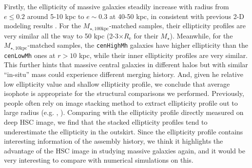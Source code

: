 \documentclass{emulateapj}
\def\rbcg{\texttt{cenHighMh}}
\def\nbcg{\texttt{cenLowMh}}
\def\mstar{{$M_{\star}$}}
\def\minn{{$M_{\star,10\mathrm{kpc}}$}}
\def\mtot{{$M_{\star,100\mathrm{kpc}}$}}
\begin{document}
\begin{CJK*}{UTF8}{gbsn}
    Firstly, the ellipticity of massive galaxies steadily increase with radius 
    from $e\le 0.2$ around 5-10 kpc to $e\sim 0.3$ at 40-50 kpc, in consistent with 
    previous 2-D modeling results \citep{Huang2013a}.  
    For the \mtot{}-matched samples, their ellipticity profiles are very similar 
    all the way to 50 kpc (2-3$\times R_{\mathrm{e}}$ for their \mstar{}). 
    Meanwhile, for the \minn{}-matched samples, the \rbcg{} galaxies have higher 
    ellipticity than the \nbcg{} ones at $r > 10$ kpc, while their inner ellipticity 
    profiles are very similar.  
    This further hints that massive central galaxies in different halos but with 
    similar ``in-situ'' mass could experience different merging history.
    And, given he relative low ellipticity value and shallow ellipticity profile, 
    we conclude that average isophote is appropriate for the structural comparisons 
    we performed.
    Previously, people often rely on image stacking method to extract ellipticity 
    profile out to large radius (e.g. \citealt{Tal2011}, \citealt{DSouza2015}).
    Comparing with the ellipticity profile directly measured on deep HSC image, 
    we find that the stacked ellipticity profiles tend to underestimate the 
    ellipticity in the outskirt. 
    Since the ellipticity profile contains interesting information of the assembly 
    history, we think it highlights the advantage of the HSC image in studying 
    massive galaxies again, and it would be very interesting to compare with 
    numerical simulations on this.
     
    

\end{CJK*}
\end{document}
